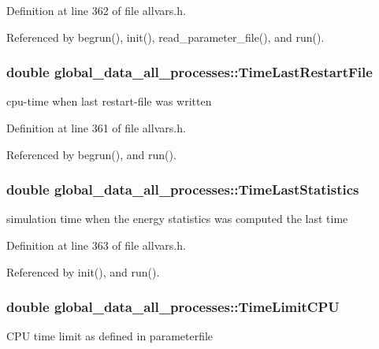 Definition at line 362 of file allvars.h.



Referenced by begrun(), init(), read\_\-parameter\_\-file(), and run().

\hypertarget{structglobal__data__all__processes_a1042ebf3c648c2b23dca6fc65ff22785}{
\subsubsection[{TimeLastRestartFile}]{\setlength{\rightskip}{0pt plus 5cm}double {\bf global\_\-data\_\-all\_\-processes::TimeLastRestartFile}}}
\label{structglobal__data__all__processes_a1042ebf3c648c2b23dca6fc65ff22785}
cpu-\/time when last restart-\/file was written 

Definition at line 361 of file allvars.h.



Referenced by begrun(), and run().

\hypertarget{structglobal__data__all__processes_ab088f20e7889a88f2e0f652df4781e44}{
\subsubsection[{TimeLastStatistics}]{\setlength{\rightskip}{0pt plus 5cm}double {\bf global\_\-data\_\-all\_\-processes::TimeLastStatistics}}}
\label{structglobal__data__all__processes_ab088f20e7889a88f2e0f652df4781e44}
simulation time when the energy statistics was computed the last time 

Definition at line 363 of file allvars.h.



Referenced by init(), and run().

\hypertarget{structglobal__data__all__processes_accf0e0ec1acab3f51f583470910049d2}{
\subsubsection[{TimeLimitCPU}]{\setlength{\rightskip}{0pt plus 5cm}double {\bf global\_\-data\_\-all\_\-processes::TimeLimitCPU}}}
\label{structglobal__data__all__processes_accf0e0ec1acab3f51f583470910049d2}
CPU time limit as defined in parameterfile 


